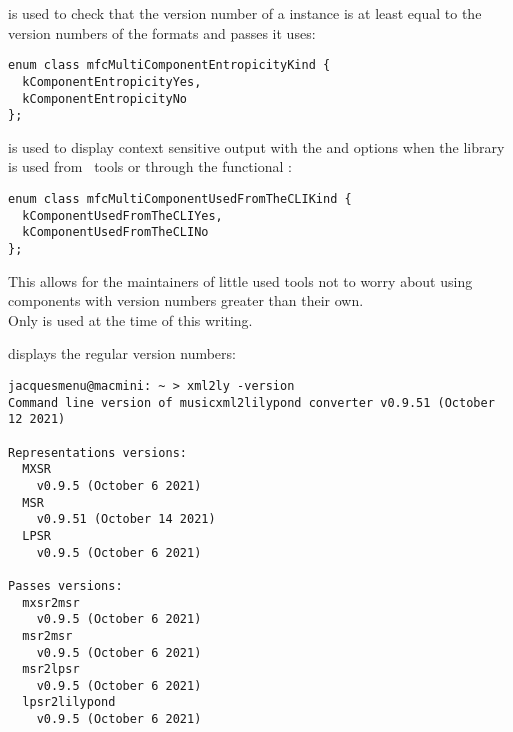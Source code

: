  is used to check that the version number of a  instance is at least equal to the version numbers of the formats and passes it uses:
\begin{lstlisting}[language=CPlusPlus]
enum class mfcMultiComponentEntropicityKind {
  kComponentEntropicityYes,
  kComponentEntropicityNo
};
\end{lstlisting}

 is used to display context sensitive output with the  and  options when the library is used from \CLI\ tools or through the functional \API:
\begin{lstlisting}[language=CPlusPlus]
enum class mfcMultiComponentUsedFromTheCLIKind {
  kComponentUsedFromTheCLIYes,
  kComponentUsedFromTheCLINo
};
\end{lstlisting}

This allows for the maintainers of little used tools not to worry about using components with version numbers greater than their own. \\
Only  is used at the time of this writing.

 displays the regular version numbers:
\begin{lstlisting}[language=Terminal]
jacquesmenu@macmini: ~ > xml2ly -version
Command line version of musicxml2lilypond converter v0.9.51 (October 12 2021)

Representations versions:
  MXSR
    v0.9.5 (October 6 2021)
  MSR
    v0.9.51 (October 14 2021)
  LPSR
    v0.9.5 (October 6 2021)

Passes versions:
  mxsr2msr
    v0.9.5 (October 6 2021)
  msr2msr
    v0.9.5 (October 6 2021)
  msr2lpsr
    v0.9.5 (October 6 2021)
  lpsr2lilypond
    v0.9.5 (October 6 2021)
\end{lstlisting}

